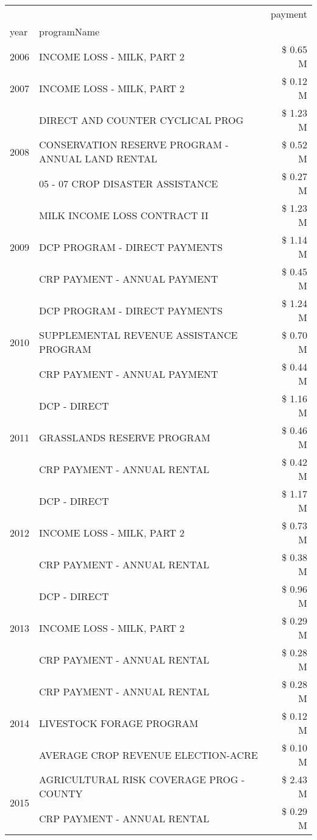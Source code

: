 \begin{tabular}{llr}
\toprule
 &  & payment \\
year & programName &  \\
\midrule
2006 & INCOME LOSS - MILK, PART 2 & \$ 0.65 M \\
\cline{1-3}
2007 & INCOME LOSS - MILK, PART 2 & \$ 0.12 M \\
\cline{1-3}
\multirow[t]{3}{*}{2008} & DIRECT AND COUNTER CYCLICAL PROG & \$ 1.23 M \\
 & CONSERVATION RESERVE PROGRAM - ANNUAL LAND RENTAL & \$ 0.52 M \\
 & 05 - 07 CROP DISASTER ASSISTANCE & \$ 0.27 M \\
\cline{1-3}
\multirow[t]{3}{*}{2009} & MILK INCOME LOSS CONTRACT II & \$ 1.23 M \\
 & DCP PROGRAM - DIRECT PAYMENTS & \$ 1.14 M \\
 & CRP PAYMENT - ANNUAL PAYMENT & \$ 0.45 M \\
\cline{1-3}
\multirow[t]{3}{*}{2010} & DCP PROGRAM - DIRECT PAYMENTS & \$ 1.24 M \\
 & SUPPLEMENTAL REVENUE ASSISTANCE PROGRAM & \$ 0.70 M \\
 & CRP PAYMENT - ANNUAL PAYMENT & \$ 0.44 M \\
\cline{1-3}
\multirow[t]{3}{*}{2011} & DCP - DIRECT & \$ 1.16 M \\
 & GRASSLANDS RESERVE PROGRAM & \$ 0.46 M \\
 & CRP PAYMENT - ANNUAL RENTAL & \$ 0.42 M \\
\cline{1-3}
\multirow[t]{3}{*}{2012} & DCP - DIRECT & \$ 1.17 M \\
 & INCOME LOSS - MILK, PART 2 & \$ 0.73 M \\
 & CRP PAYMENT - ANNUAL RENTAL & \$ 0.38 M \\
\cline{1-3}
\multirow[t]{3}{*}{2013} & DCP - DIRECT & \$ 0.96 M \\
 & INCOME LOSS - MILK, PART 2 & \$ 0.29 M \\
 & CRP PAYMENT - ANNUAL RENTAL & \$ 0.28 M \\
\cline{1-3}
\multirow[t]{3}{*}{2014} & CRP PAYMENT - ANNUAL RENTAL & \$ 0.28 M \\
 & LIVESTOCK FORAGE PROGRAM & \$ 0.12 M \\
 & AVERAGE CROP REVENUE ELECTION-ACRE & \$ 0.10 M \\
\cline{1-3}
\multirow[t]{3}{*}{2015} & AGRICULTURAL RISK COVERAGE PROG - COUNTY & \$ 2.43 M \\
 & CRP PAYMENT - ANNUAL RENTAL & \$ 0.29 M \\

\end{tabular}
